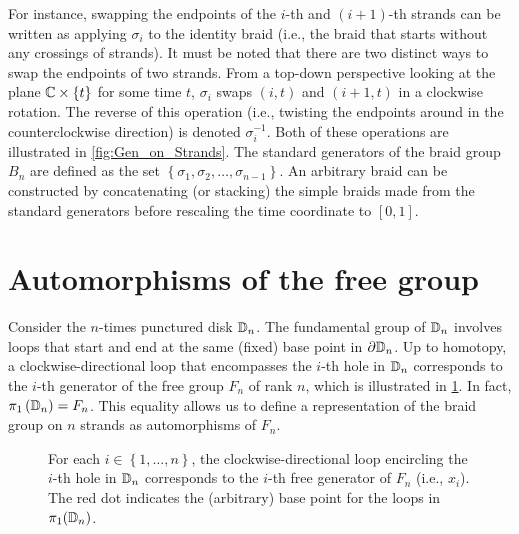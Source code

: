 For instance, swapping the endpoints of the $i$-th and $(i+1)$-th strands can be written as applying $\sigma_i$ to the identity braid (i.e., the braid that starts without any crossings of strands). It must be noted that there are two distinct ways to swap the endpoints of two strands. From a top-down perspective looking at the plane $\mathbb{C}\times\left\{ t \right\}$ for some time $t$, $\sigma_i$ swaps $(i,t)$ and $(i+1,t)$ in a clockwise rotation. The reverse of this operation (i.e., twisting the endpoints around in the counterclockwise direction) is denoted $\sigma_i^{-1}$. Both of these operations are illustrated in \cref{fig:Gen_on_Strands}. The standard generators of the braid group $B_n$ are defined as the set $\left\{ \sigma_1,\sigma_2,\dots,\sigma_{n-1} \right\}$. An arbitrary braid can be constructed by concatenating (or stacking) the simple braids made from the standard generators before rescaling the time coordinate to $[0,1]$.

\section{Automorphisms of the free group}\label{sec:Aut_Fn}

Consider the $n$-times punctured disk $\mathbb{D}_n$. The fundamental group of $\mathbb{D}_n$ involves loops that start and end at the same (fixed) base point in $\partial\mathbb{D}_n$. Up to homotopy, a clockwise-directional loop that encompasses the $i$-th hole in $\mathbb{D}_n$ corresponds to the $i$-th generator of the free group $F_n$ of rank $n$, which is illustrated in \cref{fig:Gen_on_Dn}. In fact, $\pi_1\left( \mathbb{D}_n \right) = F_n$. This equality allows us to define a representation of the braid group on $n$ strands as automorphisms of $F_n$.

\begin{figure}[htbp]
    \centering
    
    \caption{For each $i\in\left\{ 1,\dots,n \right\}$, the clockwise-directional loop encircling the $i$-th hole in $\mathbb{D}_n$ corresponds to the $i$-th free generator of $F_n$ (i.e., $x_i$). The red dot indicates the (arbitrary) base point for the loops in $\pi_1(\mathbb{D}_n)$.}\label{fig:Gen_on_Dn}
\end{figure}

